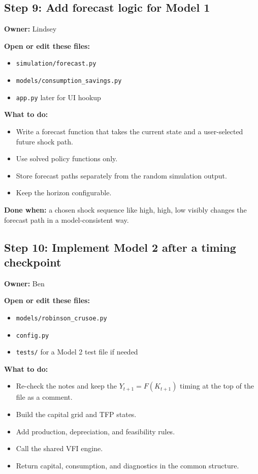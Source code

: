 \documentclass[11pt]{article}
\begin{document}
\subsection{Step 9: Add forecast logic for Model 1}
\textbf{Owner:} Lindsey

\textbf{Open or edit these files:}
\begin{itemize}
    \item \texttt{simulation/forecast.py}
    \item \texttt{models/consumption\_savings.py}
    \item \texttt{app.py} later for UI hookup
\end{itemize}

\textbf{What to do:}
\begin{itemize}
    \item Write a forecast function that takes the current state and a user-selected future shock path.
    \item Use solved policy functions only.
    \item Store forecast paths separately from the random simulation output.
    \item Keep the horizon configurable.
\end{itemize}

\textbf{Done when:} a chosen shock sequence like high, high, low visibly changes the forecast path in a model-consistent way.

\subsection{Step 10: Implement Model 2 after a timing checkpoint}
\textbf{Owner:} Ben

\textbf{Open or edit these files:}
\begin{itemize}
    \item \texttt{models/robinson\_crusoe.py}
    \item \texttt{config.py}
    \item \texttt{tests/} for a Model 2 test file if needed
\end{itemize}

\textbf{What to do:}
\begin{itemize}
    \item Re-check the notes and keep the \(Y_{t+1}=F(K_{t+1})\) timing at the top of the file as a comment.
    \item Build the capital grid and TFP states.
    \item Add production, depreciation, and feasibility rules.
    \item Call the shared VFI engine.
    \item Return capital, consumption, and diagnostics in the common structure.
\end{itemize}
\end{document}
